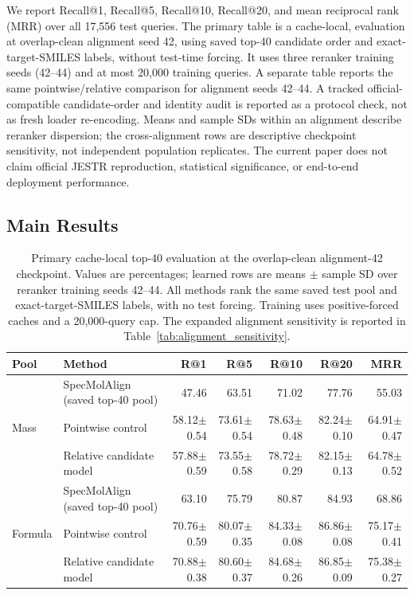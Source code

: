 \documentclass[runningheads]{llncs}
\newcommand{\base}{SpecMolAlign}
\begin{document}
We report Recall@1, Recall@5, Recall@10, Recall@20, and mean reciprocal rank
(MRR) over all 17,556 test queries. The primary table is a cache-local,
evaluation at overlap-clean alignment seed 42, using saved top-40 candidate
order and exact-target-SMILES labels, without test-time forcing. It uses three
reranker training seeds (42--44) and at most 20,000 training queries. A separate
table reports the same pointwise/relative comparison for alignment seeds
42--44. A tracked official-compatible candidate-order and identity audit is
reported as a protocol check, not as fresh loader re-encoding. Means and sample
SDs within an alignment describe reranker dispersion; the cross-alignment rows
are descriptive checkpoint sensitivity, not independent population
replicates. The current paper does not claim official JESTR reproduction,
statistical significance, or end-to-end deployment performance.

\subsection{Main Results}

\begin{table}[t]
  \centering
  \caption{Primary cache-local top-40 evaluation at the overlap-clean
  alignment-42 checkpoint. Values are percentages; learned rows are means
  $\pm$ sample SD over reranker training seeds 42--44. All methods rank the
  same saved test pool and exact-target-SMILES labels, with no test forcing.
  Training uses positive-forced caches and a 20,000-query cap. The expanded alignment
  sensitivity is reported in Table~\ref{tab:alignment_sensitivity}.}
  \label{tab:main_results}
  \tiny
  \setlength{\tabcolsep}{1pt}
  \begin{tabular}{@{}l>{\raggedright\arraybackslash}p{4.2cm}rrrrr@{}}
    \toprule
    Pool & Method & R@1 & R@5 & R@10 & R@20 & MRR \\
    \midrule
    \multirow{3}{*}{Mass}
      & \base{} (saved top-40 pool) & 47.46 & 63.51 & 71.02 & 77.76 & 55.03 \\
      & Pointwise control
      & 58.12$\pm$0.54 & 73.61$\pm$0.54 & 78.63$\pm$0.48 & 82.24$\pm$0.10 & 64.91$\pm$0.47 \\
      & Relative candidate model
      & 57.88$\pm$0.59 & 73.55$\pm$0.58 & 78.72$\pm$0.29 & 82.15$\pm$0.13 & 64.78$\pm$0.52 \\
    \midrule
    \multirow{3}{*}{Formula}
      & \base{} (saved top-40 pool) & 63.10 & 75.79 & 80.87 & 84.93 & 68.86 \\
      & Pointwise control
      & 70.76$\pm$0.59 & 80.07$\pm$0.35 & 84.33$\pm$0.08 & 86.86$\pm$0.08 & 75.17$\pm$0.41 \\
      & Relative candidate model
      & 70.88$\pm$0.38 & 80.60$\pm$0.37 & 84.68$\pm$0.26 & 86.85$\pm$0.09 & 75.38$\pm$0.27 \\
    \bottomrule
  \end{tabular}
\end{table}
\end{document}
